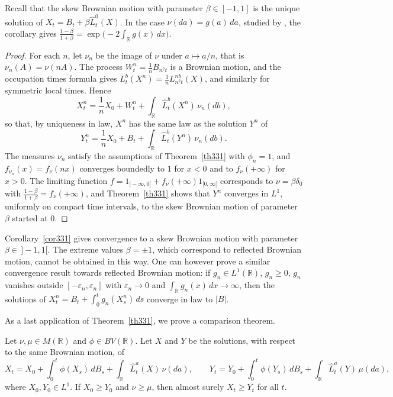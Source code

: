 \begin{remark}
	Recall that the skew Brownian motion with parameter $\beta\in[-1,1]$ is the
	unique solution of $X_t = B_t + \beta \hat{L}_t^0(X)$. In the case
	$\nu(da)=g(a)\,da$, studied by \citet{Rosenkrantz1975}, the corollary gives
	$\frac{1-\beta}{1+\beta}= \exp\big(-2\int_\mathbb{R} g(x)\,dx\big)$.
\end{remark}

\begin{proof}
	For each $n$, let $\nu_n$ be the image of $\nu$ under $a\mapsto a/n$, that is
	$\nu_n(A)=\nu(nA)$. The process $W^n_t = \frac{1}{n}B_{n^2t}$ is a Brownian motion,
	and the occupation times formula gives
	$L^b_t(X^n) = \frac{1}{n} L^{nb}_{n^2t}(X)$, and similarly for symmetric local
	times. Hence
	\[
		X_t^n=\frac{1}{n}X_0 + W^n_t+\int_\mathbb{R} \hat{L}_t^b(X^n)\,\nu_n(db),
	\]
	so that, by uniqueness in law, $X^n$ has the same law as the solution $Y^n$ of
	\[
		Y_t^n=\frac{1}{n}X_0 + B_t+\int_\mathbb{R} \hat{L}_t^b(Y^n)\,\nu_n(db) .
	\]
	The measures $\nu_n$ satisfy the assumptions of Theorem~\ref{th331} with
	$\phi_n = 1$, and $f_{\nu_n}(x) = f_\nu(nx)$ converges boundedly to $1$ for $x<0$
	and to $f_\nu(+\infty)$ for $x>0$. The limiting function
	$f = 1_{]-\infty,0[} + f_\nu(+\infty)1_{[0,\infty[}$ corresponds to
	$\nu = \beta\delta_0$ with $\frac{1-\beta}{1+\beta} = f_\nu(+\infty)$, and
	Theorem~\ref{th331} shows that $Y^n$ converges in $L^1$, uniformly on compact time
	intervals, to the skew Brownian motion of parameter $\beta$ started at $0$.
\end{proof}

\begin{remark}
	Corollary~\ref{cor331} gives convergence to a skew Brownian motion with
	parameter $\beta \in\,]-1,1[$. The extreme values $\beta=\pm 1$, which correspond
	to reflected Brownian motion, cannot be obtained in this way. One can however
	prove a similar convergence result towards reflected Brownian motion: if
	$g_n\in L^1(\mathbb{R})$, $g_n\geqslant 0$, $g_n$ vanishes outside
	$[-\varepsilon_n,\varepsilon_n]$ with $\varepsilon_n \to 0$ and
	$\int_\mathbb{R} g_n(x)\,dx \to \infty$, then the solutions of
	$X_t^n = B_t + \int_0^t g_n (X_s^n)\,ds$ converge in law to $|B|$.
\end{remark}

As a last application of Theorem~\ref{th331}, we prove a comparison theorem.

\begin{theorem}\label{th:comparison-nu}
	Let $\nu,\mu \in M(\mathbb{R})$ and $\phi\in BV(\mathbb{R})$. Let $X$ and $Y$ be the
	solutions, with respect to the same Brownian motion, of
	\[
		X_t=X_0 + \int_0^t \phi(X_s)\,dB_s+\int_\mathbb{R}\hat{L}_t^a(X)\,\nu(da), \qquad
		Y_t=Y_0 + \int_0^t \phi(Y_s)\,dB_s+\int_\mathbb{R}\hat{L}_t^a(Y)\,\mu(da),
	\]
	where $X_0, Y_0\in L^1$. If $X_0 \geqslant Y_0$ and $\nu \geqslant \mu$, then almost
	surely $X_t \geqslant Y_t$ for all $t$.
\end{theorem}

